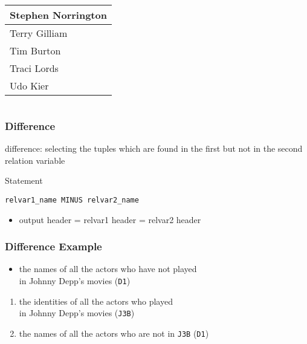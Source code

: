 \documentclass[dvipsnames]{beamer}
\theoremstyle{plain}
\begin{document}
\begin{frame}[fragile]
\begin{example}
\begin{columns}[b]
      \begin{tiny}
      \begin{table}
        \begin{tabular}{|l|}\hline
Stephen Norrington   \\\hline
Terry Gilliam        \\\hline
Tim Burton           \\\hline
Traci Lords          \\\hline
Udo Kier             \\\hline
        \end{tabular}
      \end{table}
      \end{tiny}
    \end{columns}
  \end{example}
\end{frame}

\begin{frame}[fragile]
  \frametitle{Difference}

  \begin{definition}
    \alert{difference}: selecting the tuples which are found in the first
      but not in the second relation variable
  \end{definition}

  \pause
  \begin{block}{Statement}
    \begin{lstlisting}
relvar1_name MINUS relvar2_name
    \end{lstlisting}
  \end{block}

  \pause
  \begin{itemize}
    \item output header = relvar1 header = relvar2 header
  \end{itemize}
\end{frame}

\begin{frame}
  \frametitle{Difference Example}

  \begin{example}
    \begin{itemize}
      \item the names of all the actors who have not played\\
        in Johnny Depp's movies (\texttt{D1})
    \end{itemize}

    \pause
    \begin{enumerate}
      \item the identities of all the actors who played\\
        in Johnny Depp's movies (\texttt{J3B})

      \pause
      \item the names of all the actors who are not in \texttt{J3B} (\texttt{D1})
    \end{enumerate}
  \end{example}
\end{frame}
\end{document}
